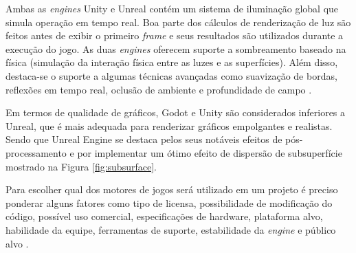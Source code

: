 

Ambas as \textit{engines} Unity e Unreal contém um sistema de iluminação global que simula operação em tempo real. Boa parte dos cálculos de renderização de luz são feitos antes de exibir o primeiro \textit{frame} e seus resultados são utilizados durante a execução do jogo. As duas \textit{engines} oferecem suporte a sombreamento baseado na física (simulação da interação física entre as luzes e as superfícies). Além disso, destaca-se o suporte a algumas técnicas avançadas como suavização de bordas, reflexões em tempo real, oclusão de ambiente e profundidade de campo \cite{compStudyGE}. 

Em termos de qualidade de gráficos, Godot e Unity são considerados inferiores a Unreal, que é mais adequada para renderizar gráficos empolgantes e realistas. Sendo que Unreal Engine se destaca pelos seus notáveis efeitos de pós-processamento e por implementar um ótimo efeito de dispersão de subsuperfície mostrado na Figura \ref{fig:subsurface}.

\begin{figure}[h!]
	\centering
\end{figure}
\nocite{subsurface}

Para escolher qual dos motores de jogos será utilizado em um projeto é preciso ponderar alguns fatores como tipo de licensa, possibilidade de modificação do código, possível uso comercial, especificações de hardware, plataforma alvo, habilidade da equipe, ferramentas de suporte, estabilidade da \textit{engine} e público alvo \cite{navarro2012}.

